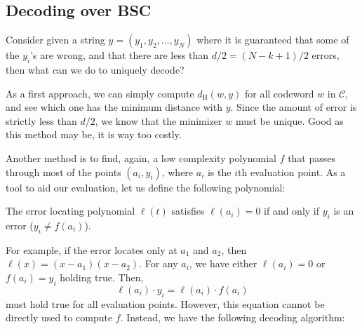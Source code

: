 \subsection{Decoding over BSC}
Consider given a string $y=(y_1,y_2,\ldots,y_N)$ where it is guaranteed that some of the $y_i$'s are wrong, and that there are less than $d/2=(N-k+1)/2$ errors, then what can we do to uniquely decode?

As a first approach, we can simply compute $d_\mathrm{H}(w,y)$ for all codeword $w$ in $\mathcal{C}$, and see which one has the minimum distance with $y$. Since the amount of error is strictly less than $d/2$, we know that the minimizer $w$ must be unique. Good as this method may be, it is way too costly.

Another method is to find, again, a low complexity polynomial $f$ that passes through most of the points $(a_i,y_i)$, where $a_i$ is the $i$th evaluation point. As a tool to aid our evaluation, let us define the following polynomial:
\begin{definition}
    The error locating polynomial $\ell(t)$ satisfies $\ell(a_i)=0$ if and only if $y_i$ is an error ($y_i\neq f(a_i)$).
\end{definition}

For example, if the error locates only at $a_1$ and $a_2$, then $\ell(x) = (x-a_1)(x-a_2)$. For any $a_i$, we have either $\ell(a_i)=0$ or $f(a_i)=y_i$ holding true. Then,
\begin{equation}
    \ell(a_i) \cdot y_i = \ell(a_i) \cdot f(a_i)
\end{equation}
must hold true for all evaluation points. However, this equation cannot be directly used to compute $f$. Instead, we have the following decoding algorithm:

